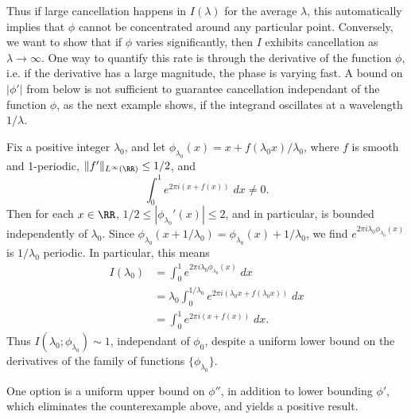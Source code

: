 Thus if large cancellation happens in $I(\lambda)$ for the average $\lambda$, this automatically implies that $\phi$ cannot be concentrated around any particular point.  Conversely, we want to show that if $\phi$ varies significantly, then $I$ exhibits cancellation as $\lambda \to \infty$. One way to quantify this rate is through the derivative of the function $\phi$, i.e. if the derivative has a large magnitude, the phase is varying fast. A bound on $|\phi'|$ from below is not sufficient to guarantee cancellation independant of the function $\phi$, as the next example shows, if the integrand oscillates at a wavelength $1/\lambda$.

\begin{example}
  Fix a positive integer $\lambda_0$, and let $\phi_{\lambda_0}(x) = x + f(\lambda_0 x) / \lambda_0$, where $f$ is smooth and 1-periodic, $\| f' \|_{L^\infty(\RR)} \leq 1/2$, and
  \[ \int_0^1 e^{2 \pi i (x + f(x))}\; dx \neq 0. \]
  Then for each $x \in \RR$, $1/2 \leq |\phi_{\lambda_0}'(x)| \leq 2$, and in particular, is bounded independently of $\lambda_0$. Since $\phi_{\lambda_0}(x + 1/\lambda_0) = \phi_{\lambda_0}(x) + 1 / \lambda_0$, we find $e^{2 \pi i \lambda_0 \phi_{\lambda_0}(x)}$ is $1/\lambda_0$ periodic. In particular, this means
  \begin{align*}
    I(\lambda_0) &= \int_0^1 e^{2 \pi i \lambda_0 \phi_{\lambda_0}(x)}\; dx\\
    &= \lambda_0 \int_0^{1/\lambda_0} e^{2 \pi i (\lambda_0 x + f(\lambda_0 x))}\; dx\\
    &= \int_0^1 e^{2 \pi i (x + f(x))}\; dx.
  \end{align*}
  Thus $I(\lambda_0;\phi_{\lambda_0}) \sim 1$, independant of $\phi_0$, despite a uniform lower bound on the derivatives of the family of functions $\{ \phi_{\lambda_0} \}$.
\end{example}

One option is a uniform upper bound on $\phi''$, in addition to lower bounding $\phi'$, which eliminates the counterexample above, and yields a positive result.

